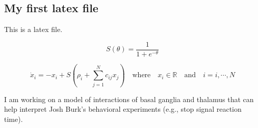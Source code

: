 \documentclass[12pt]{article}
\begin{document}
             

\begin{center}
\section*{My first latex file}  
\end{center}

This is a latex file. 

\[
S \left( \theta \right) = \frac{1}{1+e^{-\theta}}
\]

\[
\dot{x}_i = - x_i + S \left( \rho_i + \sum_{j=1}^{N} c_{ij} x_j \right) \quad \mbox{where} \quad x_i \in \mathbb{R} \quad \mbox{and} \quad i = i, \cdots, N
\]

I am working on a model of interactions of basal ganglia and thalamus that can help interpret Josh Burk's behavioral experiments (e.g., stop signal reaction time). 
\end{document}
